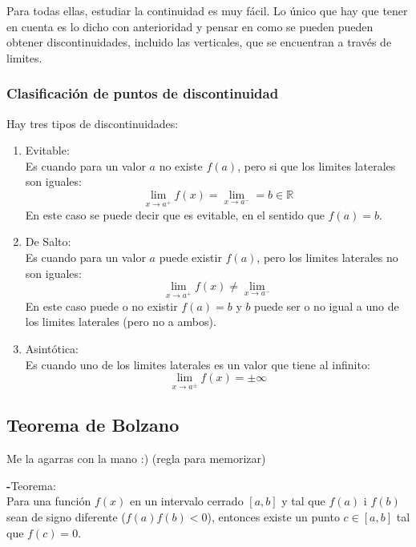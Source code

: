 \documentclass[arial,a4paper,print]{article}
\begin{document}
Para todas ellas, estudiar la continuidad es muy fácil. Lo único que hay que tener en cuenta es lo dicho con anterioridad y pensar en como se pueden pueden obtener discontinuidades, incluido las verticales, que se encuentran a través de limites. 

\pagebreak

\subsubsection{Clasificación de puntos de discontinuidad}

Hay tres tipos de discontinuidades:
\begin{enumerate}
\item Evitable:\\
Es cuando para un valor $a$ no existe $f(a)$, pero si que los limites laterales son iguales:
\begin{equation*}
	\lim_{x\rightarrow a^{+}} f(x) = \lim_{x\rightarrow a^{-}} = b \in\mathbb{R}
\end{equation*}
En este caso se puede decir que es evitable, en el sentido que $f(a) = b$. 

\item De Salto:\\
Es cuando para un valor $a$ puede existir $f(a)$, pero los limites laterales no son iguales:
\begin{equation*}
	\lim_{x\rightarrow a^{+}} f(x) \neq \lim_{x\rightarrow a^{-}} 
\end{equation*}
En este caso puede o no existir $f(a) = b$ y $b$ puede ser o no igual a uno de los limites laterales (pero no a ambos).

\item Asintótica:\\ 
Es cuando uno de los limites laterales es un valor que tiene al infinito:
\begin{equation*}
	\lim_{x\rightarrow a^{\pm}} f(x) = \pm\infty
\end{equation*}
\end{enumerate}

\subsection{Teorema de Bolzano}
Me la agarras con la mano :) (regla para memorizar)

\textbf{-}Teorema: \\
Para una función $f(x)$ en un intervalo cerrado $[a, b]$ y tal que $f(a)$ i $f(b)$ sean de signo diferente ($f(a)f(b)< 0$), entonces existe un punto $c\in[a, b]$ tal que $f(c) = 0$. \\
\end{document}
